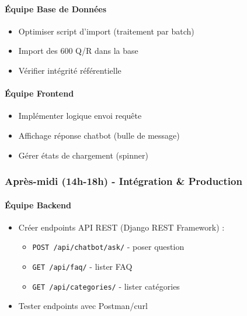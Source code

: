 \documentclass[11pt,a4paper]{article}
\begin{document}
\paragraph{Équipe Base de Données}
\begin{itemize}
    \item[$\square$] Optimiser script d'import (traitement par batch)
    \item[$\square$] Import des 600 Q/R dans la base
    \item[$\square$] Vérifier intégrité référentielle
\end{itemize}

\paragraph{Équipe Frontend}
\begin{itemize}
    \item[$\square$] Implémenter logique envoi requête
    \item[$\square$] Affichage réponse chatbot (bulle de message)
    \item[$\square$] Gérer états de chargement (spinner)
\end{itemize}

\subsubsection{Après-midi (14h-18h) - Intégration \& Production}

\paragraph{Équipe Backend}
\begin{itemize}
    \item[$\square$] Créer endpoints API REST (Django REST Framework) :
    \begin{itemize}
        \item \texttt{POST /api/chatbot/ask/} - poser question
        \item \texttt{GET /api/faq/} - lister FAQ
        \item \texttt{GET /api/categories/} - lister catégories
    \end{itemize}
    \item[$\square$] Tester endpoints avec Postman/curl
\end{itemize}
\end{document}
